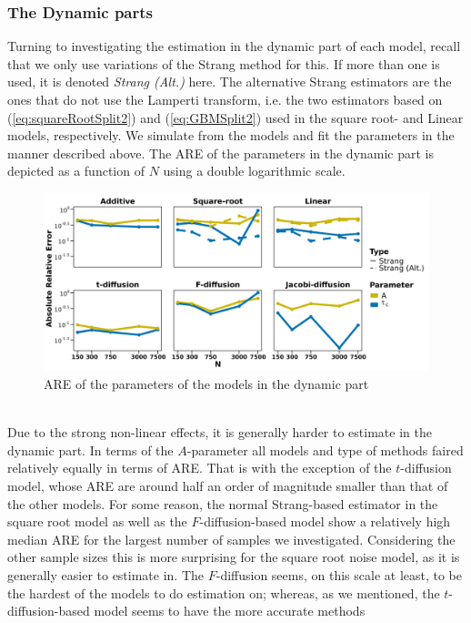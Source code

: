 \subsubsection{The Dynamic parts}
Turning to investigating the estimation in the dynamic part of each model, recall that we only use variations of the Strang method for this. If more than one is used, it is denoted \textit{Strang (Alt.)} here. The alternative Strang estimators are the ones that do not use the Lamperti transform, i.e. the two estimators based on (\ref{eq:squareRootSplit2}) and (\ref{eq:GBMSplit2}) used in the square root- and Linear models, respectively. We simulate from the models and fit the parameters in the manner described above. The ARE of the parameters in the dynamic part is depicted as a function of $N$ using a double logarithmic scale.
\begin{figure}[h!]
    \begin{center}
    \includegraphics[scale = .1]{figures/parameter_precision_dynamic.jpeg}
    \caption{ARE of the parameters of the models in the dynamic part}
    \label{figure:parameter_precision_dynamic}        
\end{center}
\end{figure}\\
Due to the strong non-linear effects, it is generally harder to estimate in the dynamic part. In terms of the $A$-parameter all models and type of methods faired relatively equally in terms of ARE. That is with the exception of the $t$-diffusion model, whose ARE are around half an order of magnitude smaller than that of the other models. For some reason, the normal Strang-based estimator in the square root model as well as the $F$-diffusion-based model show a relatively high median ARE for the largest number of samples we investigated.  Considering the other sample sizes this is more surprising for the square root noise model, as it is generally easier to estimate in. The $F$-diffusion seems, on this scale at least, to be the hardest of the models to do estimation on; whereas, as we mentioned, the $t$-diffusion-based model seems to have the more accurate methods 

